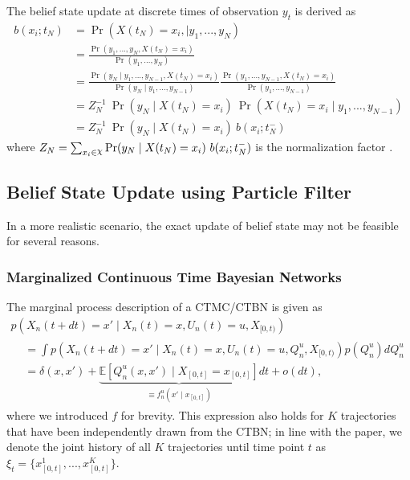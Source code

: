 The belief state update at discrete times of observation $ y_{t} $ is derived as 
\begin{align}
b(x_{i}; t_{N}) & = \operatorname{Pr}( X(t_{N}) = x_{i},\mid y_{1}, ..., y_{N}) \nonumber\\ & = \frac{\operatorname{Pr}(y_{1}, ..., y_{N}, X(t_{N}) = x_{i})}{\operatorname{Pr}(y_{1}, ..., y_{N})}  \nonumber\\ & = \frac{\operatorname{Pr}(y_{N} \mid y_{1}, ..., y_{N-1}, X(t_{N}) = x_{i})}{\operatorname{Pr}(y_{N} \mid y_{1}, ..., y_{N-1})} \frac{\operatorname{Pr}(y_{1}, ..., y_{N-1}, X(t_{N}) = x_{i})}{\operatorname{Pr}(y_{1}, ..., y_{N-1})}  \nonumber\\ & = Z_{N}^{-1} \ \operatorname{Pr}(y_{N} \mid X(t_{N})=x_{i})\ \operatorname{Pr}( X(t_{N}) = x_{i}\mid y_{1}, ..., y_{N-1})  \nonumber\\ & = Z_{N}^{-1}\ {\operatorname{Pr}(y_{N} \mid X(t_{N})=x_{i})}\ {b(x_{i}; t_{N}^{-})}
\end{align}
where $ Z_{N} = \sum_{x_{i}\in \rchi} \operatorname{Pr}(y_{N} \mid X(t_{N})=x_{i})\ b(x_{i}; t_{N}^{-}) $ is the normalization factor \cite{article}.

\subsection{Belief State Update using Particle Filter}
In a more realistic scenario, the exact update of belief state may not be feasible for several reasons. 


\subsubsection{Marginalized Continuous Time Bayesian Networks}
The marginal process description of a CTMC/CTBN is given as 
\begin{multline}
p(X_n(t + dt) = x' \mid X_n(t)=x, U_n(t)=u, X_{[0, t)})\\
\begin{split}
&= \int p(X_n(t + dt) = x' \mid X_n(t)=x, U_n(t)=u, Q^u_n, X_{[0, t)})p(Q^u_n)dQ^u_n\\
&= \delta(x, x') + \underbrace{\mathbb{E}[Q^u_n (x, x') \mid X_{[0, t]} = x_{[0, t]}]}_{\equiv f^u_n(x'\mid x_{[0, t]})}dt + o(dt),
\end{split}
\end{multline}
where we introduced $f$ for brevity. This expression also holds for $K$ trajectories that have been independently drawn from the CTBN; in line with the paper, we denote the joint history of all $K$ trajectories until time point $t$ as $\xi_t = \{x^1_{[0, t]}, ..., x^K_{[0, t]}\}$.

